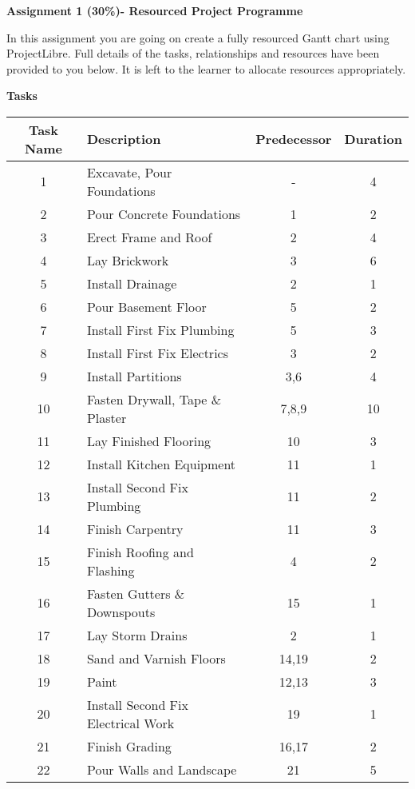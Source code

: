 
	
\begin{flushleft}
\Large\textbf{Assignment 1 (30\%)- Resourced Project Programme}\\
\end{flushleft}

In this assignment you are going on create a fully resourced Gantt chart using ProjectLibre.  Full details of the tasks, relationships and resources have been provided to you below.  It is left to the learner to allocate resources appropriately. 


\vspace{.5cm}
\large\textbf{Tasks}\\
\vspace{.25cm}

\begin{tabular}{|c|l|c|c|}
	\hline 
	\textbf{Task Name} & \textbf{Description} & \textbf{Predecessor} & \textbf{Duration} \\ 
	\hline 
	
	1	& Excavate, Pour Foundations &	-	&4\\\hline 
	2	& Pour Concrete Foundations		&1	&2\\\hline 
	3	& Erect Frame and Roof			&2	&4\\\hline 
	4	& Lay Brickwork					&3	&6\\\hline 
	5	& Install Drainage				&2	&1\\\hline 
	6	& Pour Basement Floor			&5	&2\\\hline 
	7	& Install First Fix Plumbing		&5	&3\\\hline 
	8	& Install First Fix Electrics	&3	&2\\\hline 
	9	& Install Partitions				&3,6	&4\\\hline
	10	& Fasten Drywall, Tape \& Plaster	&7,8,9	&10\\\hline 
	11	& Lay Finished Flooring			&10	&3\\\hline 
	12	& Install Kitchen Equipment		&11	&1\\\hline 
	13	& Install Second Fix Plumbing	&11	&2\\\hline 
	14	& Finish Carpentry				&11	&3\\\hline
	15	& Finish Roofing and Flashing	&4	&2\\\hline 
	16	& Fasten Gutters \& Downspouts	&15	&1\\\hline 
	17	& Lay Storm Drains				&2	&1\\\hline 
	18	& Sand and Varnish Floors		&14,19	&2\\\hline 
	19	& Paint							&12,13	&3\\\hline 
	20	& Install Second Fix Electrical Work	&19	&1\\\hline 
	21	& Finish Grading					&16,17	&2 \\\hline
	22	& Pour Walls and Landscape		&21	&5 \\
	\hline 
	 
\end{tabular} 




